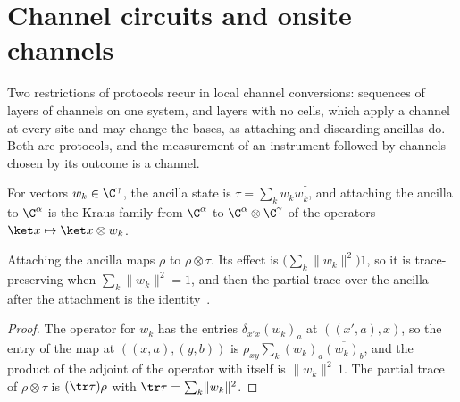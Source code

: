 \section{Channel circuits and onsite channels}
\label{sec:protocols_channel_circuits}

Two restrictions of protocols recur in local channel conversions: sequences of layers of
channels on one system, and layers with no cells, which apply a channel at every site and may
change the bases, as attaching and discarding ancillas do. Both are protocols, and the
measurement of an instrument followed by channels chosen by its outcome is a channel.

\begin{definition}
    \label{def:protocols_attach}
    \leanok
    For vectors $w_k\in\C^\gamma$, the ancilla state is $\tau=\sum_kw_kw_k^\dagger$, and
    attaching the ancilla to $\C^\alpha$ is the Kraus family from $\C^\alpha$ to
    $\C^\alpha\otimes\C^\gamma$ of the operators $\ket x\mapsto\ket x\otimes w_k$.
\end{definition}

\begin{lemma}
    \label{lem:protocols_attach}
    \leanok
    Attaching the ancilla maps $\rho$ to $\rho\otimes\tau$. Its effect is
    $\bigl(\sum_k\lVert w_k\rVert^2\bigr)1$, so it is trace-preserving when
    $\sum_k\lVert w_k\rVert^2=1$, and then the partial trace over the ancilla after the
    attachment is the identity~\cite{Piroli2021LOCC}.
\end{lemma}
\begin{proof}\leanok
    The operator for $w_k$ has the entries $\delta_{x'x}(w_k)_a$ at $((x',a),x)$, so the
    entry of the map at $((x,a),(y,b))$ is $\rho_{xy}\sum_k(w_k)_a\overline{(w_k)_b}$, and the
    product of the adjoint of the operator with itself is $\lVert w_k\rVert^2\,1$. The partial
    trace of $\rho\otimes\tau$ is $(\tr\tau)\rho$ with $\tr\tau=\sum_k\lVert w_k\rVert^2$.
\end{proof}

